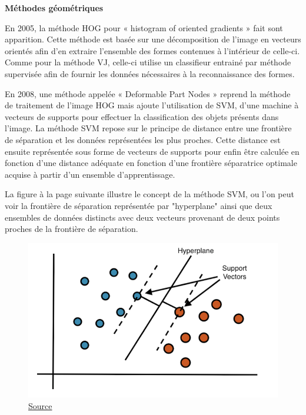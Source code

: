 \documentclass[a4paper,12pt]{article} %
\begin{document}
\textbf{Méthodes géométriques }\newline
\par
En 2005, la méthode HOG pour « histogram of oriented gradients » fait sont apparition. Cette méthode est basée sur une décomposition de l’image en vecteurs orientés afin d’en extraire l’ensemble des formes contenues à l’intérieur de celle-ci. Comme pour la méthode VJ, celle-ci utilise un classifieur entrainé par méthode supervisée afin de fournir les données nécessaires à la reconnaissance des formes. \newline
\par
En 2008, une méthode appelée « Deformable Part Nodes » reprend la méthode de traitement de l’image HOG mais ajoute l’utilisation de SVM, d'une machine à vecteurs de supports pour effectuer la classification des objets présents dans l’image. La méthode SVM repose sur le principe de distance entre une frontière de séparation et les données représentées les plus proches. Cette distance est ensuite représentée sous forme de vecteurs de supports pour enfin être calculée en fonction d’une distance adéquate en fonction d’une frontière séparatrice optimale acquise à partir d’un ensemble d’apprentissage.
\newline
\par
La figure à la page suivante illustre le concept de la méthode SVM, ou l'on peut voir la frontière de séparation représentée par "hyperplane" ainsi que deux ensembles de données distincts avec deux vecteurs provenant de deux points proches de la frontière de séparation. 
\begin{figure}[h] %
  \centering %
  \includegraphics[scale=0.40]{vectors.png} %
  \caption{\href{ https://ichi.pro/fr/explication-de-la-machine-vectorielle-de-support-svm-97743104690915}{Source} }
\end{figure}
\newline
\end{document}

